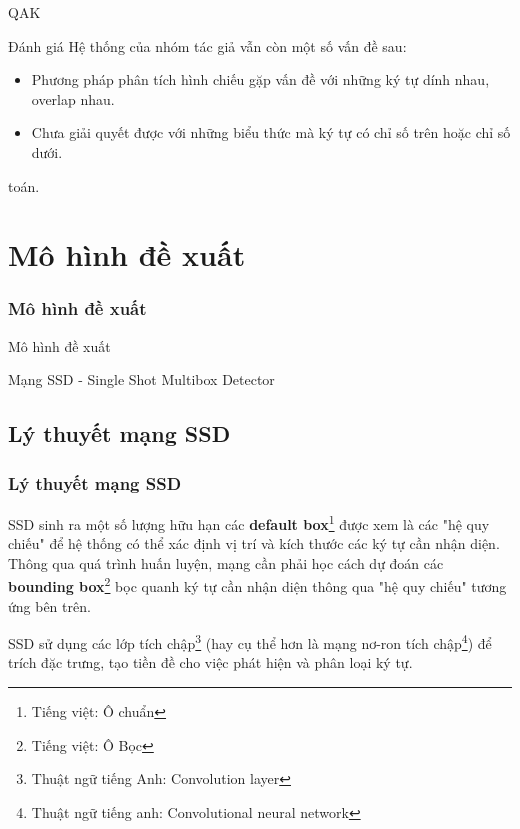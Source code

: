 \documentclass{beamer}
\begin{document}
\begin{frame}{QAK}
	\begin{block}{Đánh giá}
		Hệ thống của nhóm tác giả vẫn còn một số vấn đề sau:
		\begin{itemize}
			\item Phương pháp phân tích hình chiếu gặp vấn đề với những ký tự dính nhau, overlap nhau.
			\item Chưa giải quyết được với những biểu thức mà ký tự có chỉ số trên hoặc chỉ số dưới. 
		\end{itemize}
	\end{block}
\end{frame}

	
toán.	\section{Mô hình đề xuất}
	\begin{frame}
		\frametitle{Mô hình đề xuất}
		{\Huge Mô hình đề xuất}
		\hspace{10 cm}
		
		
		
		
		Mạng SSD - Single Shot Multibox Detector
	\end{frame}
	
	\subsection{Lý thuyết mạng SSD}
	
	\frame{\tableofcontents[currentsection]}
	
	\begin{frame}
		\frametitle{Lý thuyết mạng SSD}
		
		SSD\cite{liu2016ssd} sinh ra một số lượng hữu hạn các \textbf{default box}\footnote{Tiếng việt: Ô chuẩn} được xem là các "hệ quy chiếu" để hệ thống có thể xác định vị trí và kích thước các ký tự cần nhận diện. Thông qua quá trình huấn luyện, mạng cần phải học cách dự đoán các \textbf{bounding box}\footnote{Tiếng việt: Ô Bọc} bọc quanh ký tự cần nhận diện thông qua "hệ quy chiếu" tương ứng bên trên.
		
		SSD\cite{liu2016ssd} sử dụng các lớp tích chập\footnote{Thuật ngữ tiếng Anh: Convolution layer} (hay cụ thể hơn là mạng nơ-ron tích chập\footnote{Thuật ngữ tiếng anh: Convolutional neural network}) để trích đặc trưng, tạo tiền đề cho việc phát hiện và phân loại ký tự. \\
		
	\end{frame}
	
\end{document}
